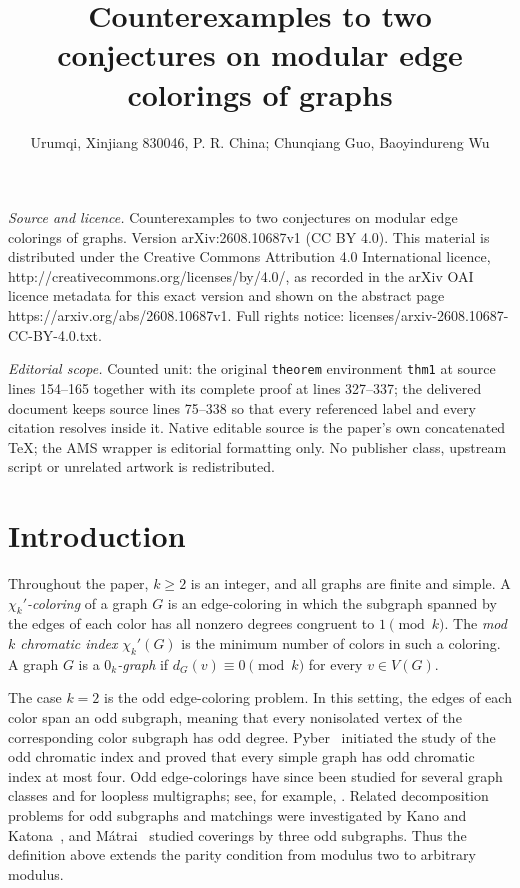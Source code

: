 \documentclass[10pt,a4paper]{amsart}
\begin{document}
\title[Counterexamples to two conjectures on modular edge colorings]{Counterexamples to two conjectures on modular edge colorings of graphs}
\author{Urumqi, Xinjiang 830046, P. R. China; Chunqiang Guo, Baoyindureng Wu}
\date{}
\maketitle
\noindent\emph{Source and licence.} Counterexamples to two conjectures on modular edge colorings of graphs. Version arXiv:2608.10687v1 (CC BY 4.0). This material is distributed under the Creative Commons Attribution 4.0 International licence, http://creativecommons.org/licenses/by/4.0/, as recorded in the arXiv OAI licence metadata for this exact version and shown on the abstract page https://arxiv.org/abs/2608.10687v1. Full rights notice: licenses/arxiv-2608.10687-CC-BY-4.0.txt.\par\smallskip
\noindent\textit{Editorial scope.} Counted unit: the original \texttt{theorem} environment \texttt{thm1} at source lines 154--165 together with its complete proof at lines 327--337; the delivered document keeps source lines 75--338 so that every referenced label and every citation resolves inside it. Native editable source is the paper's own concatenated TeX; the AMS wrapper is editorial formatting only. No publisher class, upstream script or unrelated artwork is redistributed.
\section{Introduction}\label{sec:introduction}

Throughout the paper, $k\geq2$ is an integer, and all graphs are finite
and simple. A \emph{$\chi_k'$-coloring} of a graph $G$ is an edge-coloring in
which the subgraph spanned by the edges of each color has all nonzero
degrees congruent to $1\pmod{k}$. The \emph{mod $k$ chromatic index}
$\chi_k'(G)$ is the minimum number of colors in such a coloring. A graph
$G$ is a \emph{$0_k$-graph} if $d_G(v)\equiv0\pmod{k}$ for every
$v\in V(G)$.

The case $k=2$ is the odd edge-coloring problem. In this setting, the
edges of each color span an odd subgraph, meaning that every nonisolated
vertex of the corresponding color subgraph has odd degree.
Pyber~\cite{Pyber1992} initiated the study of the odd chromatic index and
proved that every simple graph has odd chromatic index at most four. Odd
edge-colorings have since been studied for several graph classes and for
loopless multigraphs; see, for example,
\cite{LuzarPetrusevskiSkrekovski2015,AtanasovPetrusevskiSkrekovski2016,
Petrusevski2018}. Related decomposition problems for odd subgraphs and
matchings were investigated by Kano and Katona~\cite{KanoKatona2002},
and M\'atrai~\cite{Matrai2006} studied coverings by three odd subgraphs.
Thus the definition above extends the parity condition from modulus two
to arbitrary modulus.
\end{document}
